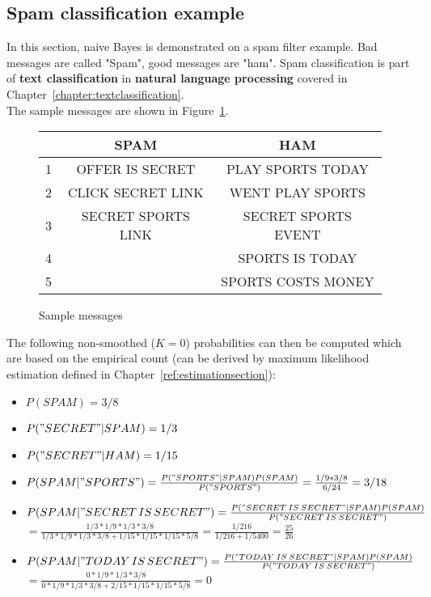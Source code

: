\documentclass{report}
\begin{document}
\subsection{Spam classification example}
\label{chapter:spamclassificationexample}
In this section, naive Bayes is demonstrated on a spam filter example. Bad messages are called "Spam", good messages are "ham".
Spam classification is part of {\bf text classification} in {\bf natural language processing} covered in Chapter~\ref{chapter:textclassification}.
\\
The sample messages are shown in Figure~\ref{ref:spamsample}.

\begin{figure}[h!]
\centering
\begin{tabular}{c||c|c}
& SPAM & HAM \\
\hline
\hline
1 & OFFER IS SECRET & PLAY SPORTS TODAY \\
2 & CLICK SECRET LINK & WENT PLAY SPORTS \\
3 & SECRET SPORTS LINK & SECRET SPORTS EVENT \\
4 & & SPORTS IS TODAY \\
5 & & SPORTS COSTS MONEY \\
\end{tabular}
\caption{Sample messages}
\label{ref:spamsample}
\end{figure}

The following non-smoothed ($K=0$) probabilities can then be computed which are based on the empirical count (can be derived by maximum likelihood estimation defined in Chapter~\ref{ref:estimationsection}):
\begin{itemize}
\item $P(SPAM) = 3/8$
\item $P("SECRET"\vert SPAM) = 1/3$
\item $P("SECRET"\vert HAM) = 1/15$
\item $P(SPAM\vert "SPORTS") = \frac{P("SPORTS"\vert SPAM)P(SPAM)}{P("SPORTS")}=\frac{1/9 * 3/8}{6/24}=3/18$
\item $P(SPAM\vert "SECRET\,IS\,SECRET")= \frac{P("SECRET\:IS\:SECRET"\vert SPAM)P(SPAM)}{P("SECRET\:IS\:SECRET")}$\\
$=\frac{1/3*1/9*1/3*3/8}{1/3*1/9*1/3*3/8+1/15*1/15*1/15*5/8}=\frac{1/216}{1/216+1/5400}=\frac{25}{26}$
\item $P(SPAM\vert "TODAY\,IS\,SECRET")= \frac{P("TODAY\:IS\:SECRET"\vert SPAM)P(SPAM)}{P("TODAY\:IS\:SECRET")}$\\
$=\frac{0*1/9*1/3*3/8}{0*1/9*1/3*3/8+2/15*1/15*1/15*5/8}=0$
\end{itemize}
\end{document}
